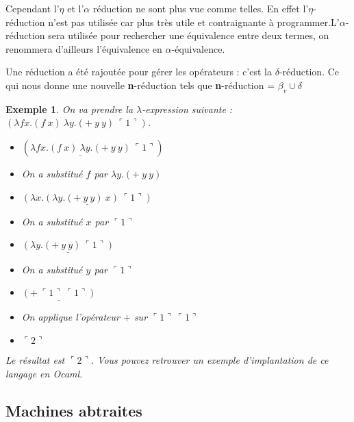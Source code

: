 \documentclass[10pt,a4paper]{report}
\newtheorem{ex}{Exemple}
\begin{document}
Cependant l'$\eta$ et l'$\alpha$ réduction ne sont plus vue comme telles. En effet l'$\eta$-réduction n'est pas utilisée car plus très utile et contraignante à programmer.L'$\alpha$-réduction sera utilisée pour rechercher une équivalence entre deux termes, on renommera d'ailleurs l'équivalence en $\alpha$-équivalence.
\medbreak

Une réduction a été rajoutée pour gérer les opérateurs : c'est la $\delta$-réduction. Ce qui nous donne une nouvelle \textbf{n}-réduction tels que \textbf{n}-réduction = $\beta_{v} \cup \delta$
\medbreak

\begin{ex}
	On va prendre la $\lambda$-expression suivante : $(\lambda f x.(f~x)~\lambda y.(+~y~y)~\ulcorner 1\urcorner)$. 
	\smallbreak
	\begin{itemize}
		\item[] $(\underline{\lambda f x.(f~x)~\lambda y.(+~y~y)}~\ulcorner 1\urcorner)$
		\item[] On a substitué $f$ par $\lambda y.(+~y~y)$
		\item[$\rightarrow^{\beta}_{n}$] $\underline{(\lambda x.(\lambda y.(+~y~y)~x)~\ulcorner 1\urcorner)}$
		
		\item[] On a substitué $x$ par $\ulcorner 1\urcorner$
		\item[$\rightarrow^{\beta}_{n}$] $\underline{(\lambda y.(+~y~y)~\ulcorner 1\urcorner)}$
		
		\item[] On a substitué $y$ par $\ulcorner 1\urcorner$
		\item[$\rightarrow^{\beta}_{n}$] $\underline{(+~\ulcorner 1\urcorner~\ulcorner 1\urcorner)}$
		
		\item[] On applique l'opérateur $+$ sur $\ulcorner 1\urcorner~\ulcorner 1\urcorner$
		\item[$\rightarrow^{\delta}_{n}$] $\ulcorner 2\urcorner$
	\end{itemize}
	\smallbreak
	Le résultat est $\ulcorner 2\urcorner$. Vous pouvez retrouver un exemple d'implantation de ce langage en Ocaml.
\end{ex}
\newpage

\subsection{Machines abtraites}
\end{document}

